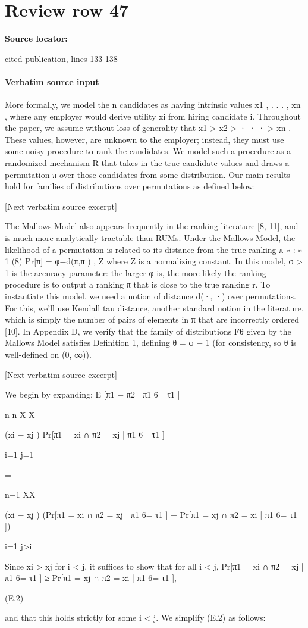 \documentclass[10pt]{article}
\begin{document}
\section*{Review row 47}
\textbf{Source locator:} {\footnotesize\raggedright cited publication, lines 133-\allowbreak{}138\par}
\paragraph{Verbatim source input}
\begin{ReviewVerbatim}
More formally, we model the n candidates as having intrinsic values x1 , . . . , xn , where any employer would
derive utility xi from hiring candidate i. Throughout the paper, we assume without loss of generality that
x1 > x2 > · · · > xn . These values, however, are unknown to the employer; instead, they must use some
noisy procedure to rank the candidates. We model such a procedure as a randomized mechanism R that
takes in the true candidate values and draws a permutation π over those candidates from some distribution.
Our main results hold for families of distributions over permutations as defined below:

[Next verbatim source excerpt]

The Mallows Model also appears frequently in the ranking literature [8, 11], and is much more analytically
tractable than RUMs. Under the Mallows Model, the likelihood of a permutation is related to its distance
from the true ranking π ∗ :
∗
1
(8)
Pr[π] = φ−d(π,π ) ,
Z
where Z is a normalizing constant. In this model, φ > 1 is the accuracy parameter: the larger φ is, the
more likely the ranking procedure is to output a ranking π that is close to the true ranking r. To instantiate
this model, we need a notion of distance d(·, ·) over permutations. For this, we’ll use Kendall tau distance,
another standard notion in the literature, which is simply the number of pairs of elements in π that are
incorrectly ordered [10]. In Appendix D, we verify that the family of distributions Fθ given by the Mallows
Model satisfies Definition 1, defining θ = φ − 1 (for consistency, so θ is well-defined on (0, ∞)).

[Next verbatim source excerpt]

We begin by expanding:
E [π1 − π2 | π1 6= τ1 ] =

n
n X
X

(xi − xj ) Pr[π1 = xi ∩ π2 = xj | π1 6= τ1 ]

i=1 j=1

=

n−1
XX

(xi − xj ) (Pr[π1 = xi ∩ π2 = xj | π1 6= τ1 ] − Pr[π1 = xj ∩ π2 = xi | π1 6= τ1 ])

i=1 j>i

Since xi > xj for i < j, it suffices to show that for all i < j,
Pr[π1 = xi ∩ π2 = xj | π1 6= τ1 ] ≥ Pr[π1 = xj ∩ π2 = xi | π1 6= τ1 ],

(E.2)

and that this holds strictly for some i < j. We simplify (E.2) as follows:
\end{ReviewVerbatim}
\end{document}
